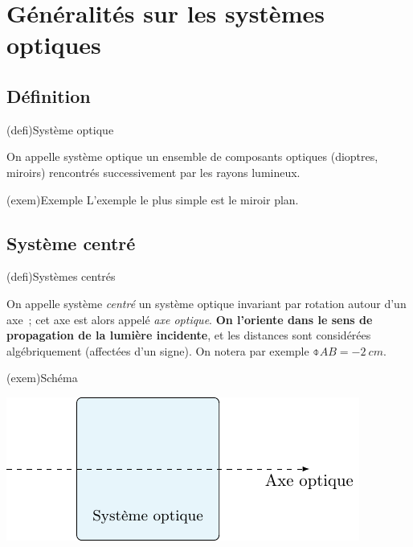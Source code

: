 \documentclass[../../main/main.tex]{subfiles}
\begin{document}
\section{Généralités sur les systèmes optiques}
\subsection{Définition}

\begin{tcbraster}[raster columns=2, raster equal height=rows]

	\begin{tcb}[label=def:so](defi){Système optique}

		On appelle système optique un ensemble de composants optiques (dioptres,
		miroirs) rencontrés successivement par les rayons lumineux.

	\end{tcb}
	\begin{tcb}(exem){Exemple}
		L'exemple le plus simple est le miroir plan.
	\end{tcb}
\end{tcbraster}

\subsection{Système centré}
\begin{tcbraster}[raster columns=2, raster equal height=rows]
	\begin{tcb}[label=def:vocso](defi){Systèmes centrés}

		On appelle système \textit{centré} un système optique invariant par
		rotation autour d'un axe~; cet axe est alors appelé \textit{axe
			optique}. \textbf{On l'oriente dans le sens de propagation de la lumière
			incidente}, et les distances sont considérées algébriquement (affectées
		d'un signe). On notera par exemple $\obar{AB} = \SI{-2}{cm}$.

	\end{tcb}
	\begin{tcb}[width=\linewidth](exem){Schéma}
		\begin{center}
			\includegraphics[width=\linewidth]{syst_opt.pdf}
			\label{fig:socent}
		\end{center}
	\end{tcb}
\end{tcbraster}
\end{document}

